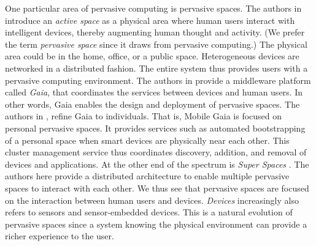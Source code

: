 One particular area of pervasive computing is pervasive spaces. The authors in \cite{2002 Roman} introduce an \emph{active space} as a physical area where human users interact with intelligent devices, thereby augmenting human thought and activity. (We prefer the term \emph{pervasive space} since it draws from pervasive computing.) The physical area could be in the home, office, or a public space. Heterogeneous devices are networked in a distributed fashion. The entire system thus provides users with a pervasive computing environment. The authors in \cite{2002 Roman} provide a middleware platform called \emph{Gaia}, that coordinates the services between devices and human users. In other words, Gaia enables the design and deployment of pervasive spaces. The authors in \cite{2004 Shankar}, \cite{2005 Chetan} refine Gaia to individuals. That is, Mobile Gaia is focused on personal pervasive spaces. It provides services such as automated bootstrapping of a personal space when smart devices are physically near each other. This cluster management service thus coordinates discovery, addition, and removal of devices and applications. At the other end of the spectrum is \emph{Super Spaces} \cite{2004 Al-Muhtadi}. The authors here provide a distributed architecture to enable multiple pervasive spaces to interact with each other. We thus see that pervasive spaces are focused on the interaction between human users and devices. \emph{Devices} increasingly also refers to sensors and sensor-embedded devices. This is a natural evolution of pervasive spaces since a system knowing the physical environment can provide a richer experience to the user.

